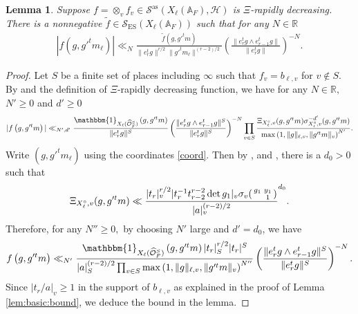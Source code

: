 \documentclass[12pt]{amsart}
\newtheorem{lem}[thm]{Lemma}
\theoremstyle{remark}
\numberwithin{equation}{section}
\newcommand{\A}{\mathbb{A}}
\newcommand{\OO}{\mathcal{O}}
\newcommand{\RR}{\mathbb{R}}
\theoremstyle{definition}
\newenvironment{psmatrix}
  {\left(\begin{smallmatrix}}
  {\end{smallmatrix}\right)}
\numberwithin{equation}{subsection}
\newcommand{\one}{\mathbbm{1}}
\newcommand{\norm}[1]{\lVert#1\rVert}
\begin{document}
\begin{lem}\label{lem:adelicbound}
    Suppose $f=\otimes_v f_v\in \mathcal{S}^{\mathrm{as}}(X_{\ell}(\A_F),\mathcal{H})$ is $\Xi$-rapidly decreasing.  There is a nonnegative $\widetilde{f} \in \mathcal{S}_{\mathrm{ES}}(X_\ell(\A_F))$ such that for any $N\in \RR$
     \begin{align*}
        |f\left(g, g'^tm_\ell\right)|\ll_N \frac{\widetilde{f}\left(g, g'^tm\right)}{\norm{e_r^t g}^{r/2}\norm{g'^tm_\ell}^{(r-2)/2}}\left(\frac{\norm{e_r^t g\wedge e_{r-1}^tg}}{\norm{e_r^tg}}\right)^{-N}.
    \end{align*}
\end{lem}
\begin{proof}
Let $S$ be a finite set of places including $\infty$ such that $f_v=b_{\ell,v}$ for $v\not\in S$. By  and the definition of $\Xi$-rapidly decreasing function, we have for any $N\in \RR,$ $N'\ge 0$ and $d'\ge 0$ 
    \begin{align*}
        |f\left(g, g'^tm\right)|\ll_{N',d'}     \frac{\one_{X_\ell(\widehat{\OO}_F^S)}\left(g, g'^tm\right)}{\norm{e_r^tg}^{S}} \left(\frac{\norm{e_r^t g\wedge e_{r-1}^tg}^S}{\norm{e_r^tg}^S}\right)^{-N}\prod_{v\in S} \frac{\Xi_{X_\ell^\circ,v}(g,g'^tm)\sigma_{X_\ell^\circ,v}^{-d'}(g,g'^tm)}{\max\left(1,\norm{g}_{\ell,v},\norm{g'^{t}m}_v\right)^{N'}}.
    \end{align*}
    Write $(g,g'^tm_\ell)$ using the coordinates \eqref{coord}. Then by ,  and , there is a $d_0>0$ such that
    \begin{align*}
        \Xi_{X_\ell^\circ,v}(g,g'^tm)\ll\frac{|t_r|_v^{r/2}|t_{r}^{-1}t_{r-2}^{r-2}\det g_1|_v \sigma_v\begin{psmatrix}
            g_1 & y_1\\
            & 1
        \end{psmatrix}}{|a|^{(r-2)/2}_v}^{d_0}.
    \end{align*}
    Therefore, for any $N''\ge 0,$ by choosing $N'$ large and $d'=d_0$, we have
    \begin{align*}
        f\left(g, g'^tm\right)\ll_{N'} \frac{\one_{X_\ell(\widehat{\OO}_F^S)}\left(g, g'^tm\right)|t_r|^{r/2}_S|t_r|^S}{|a|^{(r-2)/2}_S\prod_{v\in S}\max\left(1,\norm{g}_{\ell,v},\norm{g'^{t}m}_v\right)^{N''}}\left(\frac{\norm{e_r^t g\wedge e_{r-1}^tg}^S}{\norm{e_r^tg}^S}\right)^{-N}.
    \end{align*}
    Since $|t_r/a|_v \geq 1$ in the support of $b_{\ell,v}$ as explained in the proof of Lemma \ref{lem:basic:bound}, we deduce the bound in the lemma.
\end{proof}
\end{document}
